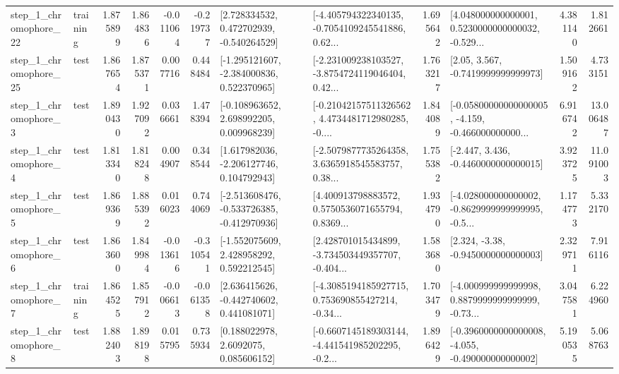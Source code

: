 \begin{tabular}{llrrrrllrlrr}
    step\_1\_chromophore\_22 &  training &      1.875899 &    1.864836 &     -0.011064 & -0.219737 &    [2.728334532, 0.472702939, -0.540264529] &  [-4.405794322340135, -0.7054109245541886, 0.62... &       1.695642 &  [4.048000000000001, 0.5230000000000032, -0.529... &            4.381140 &          1.812661 \\
    step\_1\_chromophore\_25 &      test &      1.867654 &    1.875371 &      0.007716 &  0.448484 &   [-1.295121607, -2.384000836, 0.522370965] &  [-2.231009238103527, -3.8754724119046404, 0.42... &       1.763217 &                 [2.05, 3.567, -0.7419999999999973] &            1.509162 &          4.733151 \\
     step\_1\_chromophore\_3 &      test &      1.890430 &    1.927092 &      0.036661 &  1.478394 &    [-0.108963652, 2.698992205, 0.009968239] &  [-0.21042157511326562, 4.4734481712980285, -0.... &       1.844089 &  [-0.05800000000000005, -4.159, -0.466000000000... &            6.916742 &         13.006487 \\
     step\_1\_chromophore\_4 &      test &      1.813340 &    1.818248 &      0.004907 &  0.348544 &    [1.617982036, -2.206127746, 0.104792943] &  [-2.5079877735264358, 3.6365918545583757, 0.38... &       1.755382 &               [-2.447, 3.436, -0.4460000000000015] &            3.923725 &         11.091003 \\
     step\_1\_chromophore\_5 &      test &      1.869369 &    1.885392 &      0.016023 &  0.744069 &  [-2.513608476, -0.533726385, -0.412970936] &  [4.400913798883572, 0.5750536071655794, 0.8369... &       1.934790 &  [-4.028000000000002, -0.8629999999999995, -0.5... &            1.174773 &          5.332170 \\
     step\_1\_chromophore\_6 &      test &      1.863600 &    1.849984 &     -0.013616 & -0.310541 &    [-1.552075609, 2.428958292, 0.592212545] &  [2.428701015434899, -3.734503449357707, -0.404... &       1.583680 &                [2.324, -3.38, -0.9450000000000003] &            2.329711 &          7.916116 \\
     step\_1\_chromophore\_7 &  training &      1.864525 &    1.857912 &     -0.006613 & -0.061358 &    [2.636415626, -0.442740602, 0.441081071] &  [-4.3085194185927715, 0.753690855427214, -0.34... &       1.703479 &  [-4.000999999999998, 0.8879999999999999, -0.73... &            3.047581 &          6.224960 \\
     step\_1\_chromophore\_8 &      test &      1.882403 &    1.898198 &      0.015795 &  0.735934 &       [0.188022978, 2.6092075, 0.085606152] &  [-0.6607145189303144, -4.441541985202295, -0.2... &       1.896429 &  [-0.3960000000000008, -4.055, -0.490000000000002] &            5.190535 &          5.068763 \\

\end{tabular}
